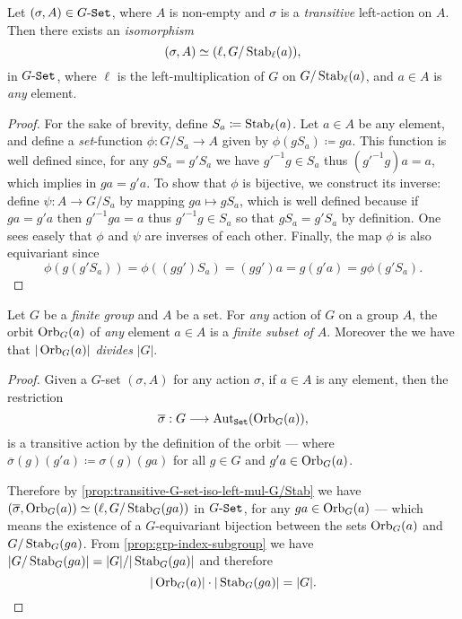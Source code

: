 \begin{proposition}
\label{prop:transitive-G-set-iso-left-mul-G/Stab}
Let \((\sigma, A) \in {{G}\text{-}{\texttt{Set}}}\), where \(A\) is non-empty and \(\sigma\)
is a \emph{transitive} left-action on \(A\). Then there exists an
\emph{isomorphism}
\[
(\sigma, A) \simeq (\ell, G/\operatorname{Stab}_{\ell}(a)),
\]
in \({{G}\text{-}{\texttt{Set}}}\), where \(\ell\) is the left-multiplication of \(G\)
on \(G/\operatorname{Stab}_{\ell}(a)\), and \(a \in A\) is \emph{any} element.
\end{proposition}

\begin{proof}
For the sake of brevity, define \(S_a \coloneq \operatorname{Stab}_{\ell}(a)\). Let
\(a \in A\) be any element, and define a \emph{set}-function
\(\phi: G/S_a \to A\) given by \(\phi(g S_a) \coloneq g a\). This function is
well defined since, for any \(g S_a = g' S_a\) we have \(g'^{-1} g \in S_a\)
thus \((g'^{-1} g) a = a\), which implies in \(g a = g' a\). To show that
\(\phi\) is bijective, we construct its inverse: define \(\psi: A \to G/S_a\) by
mapping \(g a \mapsto g S_a\), which is well defined because if \(g a = g' a\)
then \(g'^{-1} g a = a\) thus \(g'^{-1} g \in S_a\) so that \(g S_a = g' S_a\)
by definition. One sees easely that \(\phi\) and \(\psi\) are inverses of each
other. Finally, the map \(\phi\) is also equivariant since
\[
\phi(g(g' S_a)) = \phi((g g') S_a) = (g g') a = g(g'a) = g \phi(g' S_a).
\]
\end{proof}

\begin{corollary}
\label{cor:orbit-divides-order-of-group}
Let \(G\) be a \emph{finite group} and \(A\) be a set. For \emph{any} action of
\(G\) on a group \(A\), the orbit \(\operatorname{Orb}_G(a)\) of \emph{any} element
\(a \in A\) is a \emph{finite subset of \(A\)}. Moreover the we have that
\(|\operatorname{Orb}_G(a)|\) \emph{divides} \(|G|\).
\end{corollary}

\begin{proof}
Given a \(G\)-set \((\sigma, A)\) for any action \(\sigma\), if \(a \in A\) is
any element, then the restriction
\[
\overline{\sigma}: G \longrightarrow \operatorname{Aut}_{{\texttt{Set}}}(\operatorname{Orb}_G(a)),
\]
is a transitive action by the definition of the orbit --- where
\(\overline{\sigma}(g)(g' a) \coloneq \sigma(g)(g a)\) for all \(g \in G\) and
\(g' a \in \operatorname{Orb}_G(a)\).

Therefore by \cref{prop:transitive-G-set-iso-left-mul-G/Stab} we have
\((\overline{\sigma}, \operatorname{Orb}_G(a)) \simeq (\ell, G/\operatorname{Stab}_G(g a))\) in
\({{G}\text{-}{\texttt{Set}}}\), for any \(g a \in \operatorname{Orb}_G(a)\) --- which means the existence of a
\(G\)-equivariant bijection between the sets \(\operatorname{Orb}_G(a)\) and
\(G/\operatorname{Stab}_G(g a)\). From \cref{prop:grp-index-subgroup} we have
\(|G/\operatorname{Stab}_G(g a)| = |G|/|\operatorname{Stab}_G(g a)|\) and therefore
\[
|\operatorname{Orb}_G(a)| \cdot |\operatorname{Stab}_G(g a)| = |G|.
\]
\end{proof}

